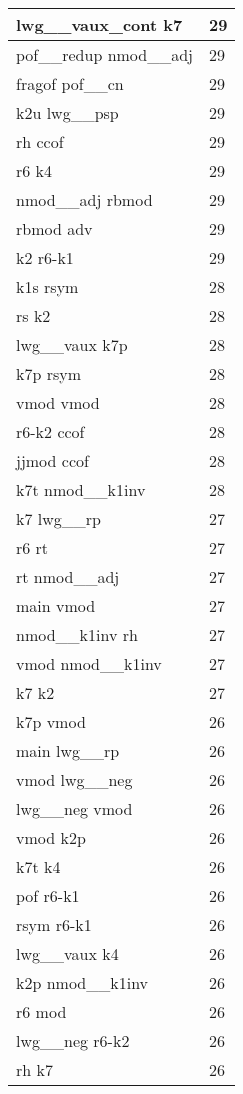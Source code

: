 \documentclass[a4 paper]{article}
\begin{document}
\begin{longtable}{p{}p{}}
lwg\_\_vaux\_cont k7  & 29 \\ \midrule
pof\_\_redup nmod\_\_adj  & 29 \\ \midrule
fragof pof\_\_cn  & 29 \\ \midrule
k2u lwg\_\_psp  & 29 \\ \midrule
rh ccof  & 29 \\ \midrule
r6 k4  & 29 \\ \midrule
nmod\_\_adj rbmod  & 29 \\ \midrule
rbmod adv  & 29 \\ \midrule
k2 r6-k1  & 29 \\ \midrule
k1s rsym  & 28 \\ \midrule
rs k2  & 28 \\ \midrule
lwg\_\_vaux k7p  & 28 \\ \midrule
k7p rsym  & 28 \\ \midrule
vmod vmod  & 28 \\ \midrule
r6-k2 ccof  & 28 \\ \midrule
jjmod ccof  & 28 \\ \midrule
k7t nmod\_\_k1inv  & 28 \\ \midrule
k7 lwg\_\_rp  & 27 \\ \midrule
r6 rt  & 27 \\ \midrule
rt nmod\_\_adj  & 27 \\ \midrule
main vmod  & 27 \\ \midrule
nmod\_\_k1inv rh  & 27 \\ \midrule
vmod nmod\_\_k1inv  & 27 \\ \midrule
k7 k2  & 27 \\ \midrule
k7p vmod  & 26 \\ \midrule
main lwg\_\_rp  & 26 \\ \midrule
vmod lwg\_\_neg  & 26 \\ \midrule
lwg\_\_neg vmod  & 26 \\ \midrule
vmod k2p  & 26 \\ \midrule
k7t k4  & 26 \\ \midrule
pof r6-k1  & 26 \\ \midrule
rsym r6-k1  & 26 \\ \midrule
lwg\_\_vaux k4  & 26 \\ \midrule
k2p nmod\_\_k1inv  & 26 \\ \midrule
r6 mod  & 26 \\ \midrule
lwg\_\_neg r6-k2  & 26 \\ \midrule
rh k7  & 26 \\ \midrule

\end{longtable}
\end{document}
